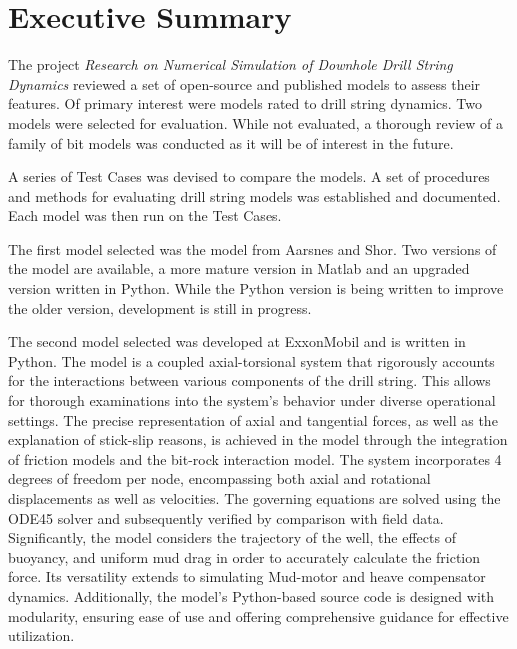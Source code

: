 \chapter*{Executive Summary}

The project \emph{Research on Numerical Simulation of Downhole Drill String Dynamics} reviewed a set of open-source and published models to assess their features.  Of primary interest were models rated to drill string dynamics.  Two models were selected for evaluation.  While not evaluated, a thorough review of a family of bit models was conducted as it will be of interest in the future.

A series of Test Cases was devised to compare the models.  A set of procedures and methods for evaluating drill string models was established and documented.  Each model was then run on the Test Cases.

The first model selected was the model from Aarsnes and Shor.  Two versions of the model are available, a more mature version in Matlab and an upgraded version written in Python.  While the Python version is being written to improve the older version, development is still in progress.

The second model selected was developed at ExxonMobil and is written in Python. The model is a coupled axial-torsional system that rigorously accounts for the interactions between various components of the drill string. This allows for thorough examinations into the system's behavior under diverse operational settings. The precise representation of axial and tangential forces, as well as the explanation of stick-slip reasons, is achieved in the model through the integration of friction models and the bit-rock interaction model. The system incorporates 4 degrees of freedom per node, encompassing both axial and rotational displacements as well as velocities. The governing equations are solved using the ODE45 solver and subsequently verified by comparison with field data. Significantly, the model considers the trajectory of the well, the effects of buoyancy, and uniform mud drag in order to accurately calculate the friction force. Its versatility extends to simulating Mud-motor and heave compensator dynamics. Additionally, the model's Python-based source code is designed with modularity, ensuring ease of use and offering comprehensive guidance for effective utilization. 



